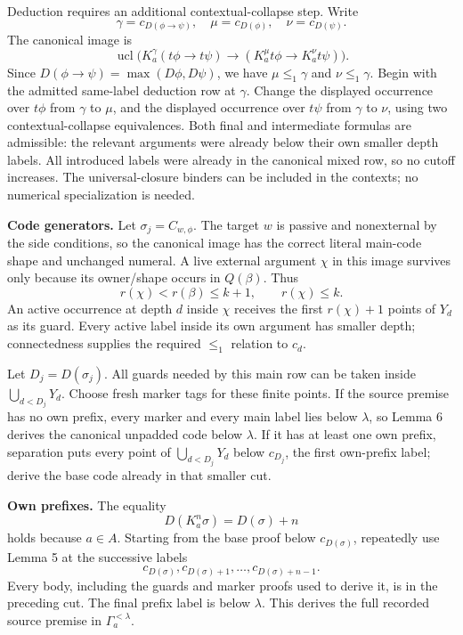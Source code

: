 \documentclass[
  11pt,
  letterpaper,
]{article}
\begin{document}
Deduction requires an additional contextual-collapse step. Write \[
\gamma=c_{D(\phi\to\psi)},\quad
\mu=c_{D(\phi)},\quad \nu=c_{D(\psi)}.
\] The canonical image is \[
\operatorname{ucl}\bigl(
K_a^\gamma(t\phi\to t\psi)\to
(K_a^\mu t\phi\to K_a^\nu t\psi)\bigr).
\] Since \(D(\phi\to\psi)=\max(D\phi,D\psi)\), we have
\(\mu\leq_1\gamma\) and \(\nu\leq_1\gamma\). Begin with the admitted
same-label deduction row at \(\gamma\). Change the displayed occurrence
over \(t\phi\) from \(\gamma\) to \(\mu\), and the displayed occurrence
over \(t\psi\) from \(\gamma\) to \(\nu\), using two contextual-collapse
equivalences. Both final and intermediate formulas are admissible: the
relevant arguments were already below their own smaller depth labels.
All introduced labels were already in the canonical mixed row, so no
cutoff increases. The universal-closure binders can be included in the
contexts; no numerical specialization is needed.

\textbf{Code generators.} Let \(\sigma_j=C_{w,\phi}\). The target \(w\)
is passive and nonexternal by the side conditions, so the canonical
image has the correct literal main-code shape and unchanged numeral. A
live external argument \(\chi\) in this image survives only because its
owner/shape occurs in \(Q(\beta)\). Thus \[
r(\chi)<r(\beta)\leq k+1,\qquad r(\chi)\leq k.
\] An active occurrence at depth \(d\) inside \(\chi\) receives the
first \(r(\chi)+1\) points of \(Y_d\) as its guard. Every active label
inside its own argument has smaller depth; connectedness supplies the
required \(\leq_1\) relation to \(c_d\).

Let \(D_j=D(\sigma_j)\). All guards needed by this main row can be taken
inside \(\bigcup_{d<D_j}Y_d\). Choose fresh marker tags for these finite
points. If the source premise has no own prefix, every marker and every
main label lies below \(\lambda\), so Lemma 6 derives the canonical
unpadded code below \(\lambda\). If it has at least one own prefix,
separation puts every point of \(\bigcup_{d<D_j}Y_d\) below \(c_{D_j}\),
the first own-prefix label; derive the base code already in that smaller
cut.

\textbf{Own prefixes.} The equality \[
D(K_a^n\sigma)=D(\sigma)+n
\] holds because \(a\in A\). Starting from the base proof below
\(c_{D(\sigma)}\), repeatedly use Lemma 5 at the successive labels \[
c_{D(\sigma)},c_{D(\sigma)+1},\ldots,
c_{D(\sigma)+n-1}.
\] Every body, including the guards and marker proofs used to derive it,
is in the preceding cut. The final prefix label is below \(\lambda\).
This derives the full recorded source premise in
\(\Gamma_a^{<\lambda}\).
\end{document}
